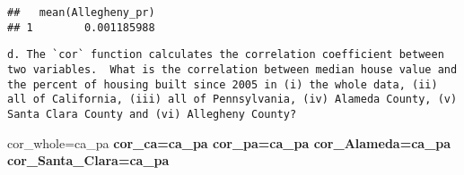 \documentclass[
]{article}
\newenvironment{Shaded}{\begin{snugshade}}{\end{snugshade}}
\newcommand{\DataTypeTok}[1]{\textcolor[rgb]{0.13,0.29,0.53}{#1}}
\newcommand{\DecValTok}[1]{\textcolor[rgb]{0.00,0.00,0.81}{#1}}
\newcommand{\KeywordTok}[1]{\textcolor[rgb]{0.13,0.29,0.53}{\textbf{#1}}}
\newcommand{\NormalTok}[1]{#1}
\newcommand{\OperatorTok}[1]{\textcolor[rgb]{0.81,0.36,0.00}{\textbf{#1}}}
\newcommand{\StringTok}[1]{\textcolor[rgb]{0.31,0.60,0.02}{#1}}
\begin{document}
\begin{verbatim}
##   mean(Allegheny_pr)
## 1        0.001185988
\end{verbatim}

\begin{verbatim}
d. The `cor` function calculates the correlation coefficient between two variables.  What is the correlation between median house value and the percent of housing built since 2005 in (i) the whole data, (ii) all of California, (iii) all of Pennsylvania, (iv) Alameda County, (v) Santa Clara County and (vi) Allegheny County?
\end{verbatim}

\begin{Shaded}
\begin{Highlighting}[]
\NormalTok{cor_whole=ca_pa }\OperatorTok{%>%}\StringTok{ }\KeywordTok{mutate}\NormalTok{(}\DataTypeTok{pr=}\NormalTok{Built_}\DecValTok{2005}\NormalTok{_or_later}\OperatorTok{/}\NormalTok{Total_units) }\OperatorTok{%>%}\StringTok{ }\KeywordTok{summarise}\NormalTok{(}\KeywordTok{cor}\NormalTok{(pr,Median_house_value))}
\NormalTok{cor_ca=ca_pa }\OperatorTok{%>%}\StringTok{ }\KeywordTok{mutate}\NormalTok{(}\DataTypeTok{pr=}\NormalTok{Built_}\DecValTok{2005}\NormalTok{_or_later}\OperatorTok{/}\NormalTok{Total_units) }\OperatorTok{%>%}\StringTok{ }\KeywordTok{filter}\NormalTok{(STATEFP}\OperatorTok{==}\DecValTok{6}\NormalTok{) }\OperatorTok{%>%}\StringTok{ }\KeywordTok{summarise}\NormalTok{(}\KeywordTok{cor}\NormalTok{(pr,Median_house_value))}
\NormalTok{cor_pa=ca_pa }\OperatorTok{%>%}\StringTok{ }\KeywordTok{mutate}\NormalTok{(}\DataTypeTok{pr=}\NormalTok{Built_}\DecValTok{2005}\NormalTok{_or_later}\OperatorTok{/}\NormalTok{Total_units) }\OperatorTok{%>%}\StringTok{ }\KeywordTok{filter}\NormalTok{(STATEFP}\OperatorTok{==}\DecValTok{42}\NormalTok{) }\OperatorTok{%>%}\StringTok{ }\KeywordTok{summarise}\NormalTok{(}\KeywordTok{cor}\NormalTok{(pr,Median_house_value))}
\NormalTok{cor_Alameda=ca_pa }\OperatorTok{%>%}\StringTok{ }\KeywordTok{mutate}\NormalTok{(}\DataTypeTok{pr=}\NormalTok{Built_}\DecValTok{2005}\NormalTok{_or_later}\OperatorTok{/}\NormalTok{Total_units) }\OperatorTok{%>%}\StringTok{ }\KeywordTok{filter}\NormalTok{(STATEFP}\OperatorTok{==}\DecValTok{6}\NormalTok{,COUNTYFP}\OperatorTok{==}\DecValTok{1}\NormalTok{) }\OperatorTok{%>%}\StringTok{ }\KeywordTok{summarise}\NormalTok{(}\KeywordTok{cor}\NormalTok{(pr,Median_house_value))}
\NormalTok{cor_Santa_Clara=ca_pa }\OperatorTok{%>%}\StringTok{ }\KeywordTok{mutate}\NormalTok{(}\DataTypeTok{pr=}\NormalTok{Built_}\DecValTok{2005}\NormalTok{_or_later}\OperatorTok{/}\NormalTok{Total_units) }\OperatorTok{%>%}\StringTok{ }\KeywordTok{filter}\NormalTok{(STATEFP}\OperatorTok{==}\DecValTok{6}\NormalTok{,COUNTYFP}\OperatorTok{==}\DecValTok{85}\NormalTok{) }\OperatorTok{%>%}\StringTok{ }\KeywordTok{summarise}\NormalTok{(}\KeywordTok{cor}\NormalTok{(pr,Median_house_value))}
}}}}}
\end{Highlighting}
\end{Shaded}
\end{document}
